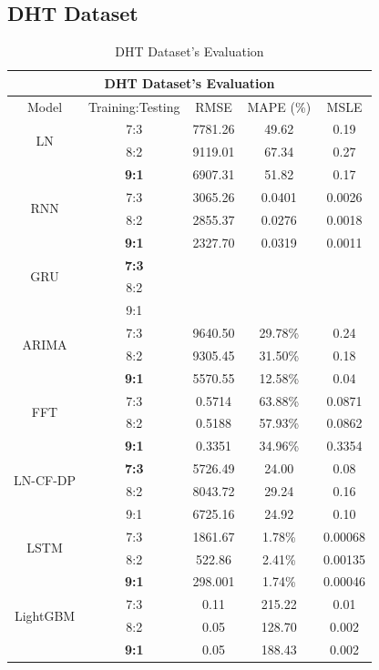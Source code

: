 \documentclass{ieeeojies}
\begin{document}
\vspace{-1em}

\subsection{DHT Dataset} 
\begin{table}[H]
    \centering
    \begin{tabular}{|c|c|c|c|c|}
         \hline
         \multicolumn{5}{|c|}{\textbf{DHT Dataset's Evaluation}}\\
         \hline
         \centering Model & Training:Testing & RMSE & MAPE (\%) & MSLE\\
         \hline
         \multirow{2}{*}{LN}& 7:3 & 7781.26 & 49.62 & 0.19\\ & 8:2 & 9119.01 & 67.34 & 0.27\\ & \textbf{9:1}& 6907.31& 51.82 & 0.17\\
         \hline
         \multirow{2}{*}{RNN} & 7:3&3065.26&0.0401&0.0026\\ & 8:2&2855.37&0.0276&0.0018\\ & \textbf{9:1} &2327.70 &0.0319 & 0.0011\\
         \hline
         \multirow{2}{*}{GRU} & \textbf{7:3}	& & & \\ & 8:2 & & & \\ & 9:1 & & & \\
         \hline
         \multirow{2}{*}{ARIMA} & 7:3 & 9640.50 & 29.78\% &0.24 \\ & 8:2 & 9305.45 &31.50\% & 0.18\\ & \textbf{9:1} &5570.55 &12.58\% & 0.04\\
         \hline
         \multirow{2}{*}{FFT}& 7:3	& 0.5714& 63.88\%& 0.0871\\ & 8:2 & 0.5188& 57.93\%& 0.0862\\ & \textbf{9:1} & 0.3351& 34.96\%& 0.3354\\
         \hline
        \multirow{2}{*}{LN-CF-DP} & \textbf{7:3} & 5726.49&24.00&0.08 \\ & 8:2 &8043.72& 29.24& 0.16\\ & 9:1 &6725.16&24.92&0.10\\
         \hline
         \multirow{2}{*}{LSTM}& 7:3& 1861.67& 1.78\%& 0.00068\\ & 8:2 & 522.86& 2.41\%& 0.00135\\ & \textbf{9:1}& 298.001& 1.74\%& 0.00046\\
         \hline
         \multirow{2}{*}{LightGBM}& 7:3& 0.11& 215.22 & 0.01\\ & 8:2 & 0.05& 128.70 & 0.002\\ & \textbf{9:1}& 0.05& 188.43 & 0.002\\
         \hline
    \end{tabular}
    \caption{DHT Dataset's Evaluation}
    \label{dhtresult}
\end{table}
\end{document}
